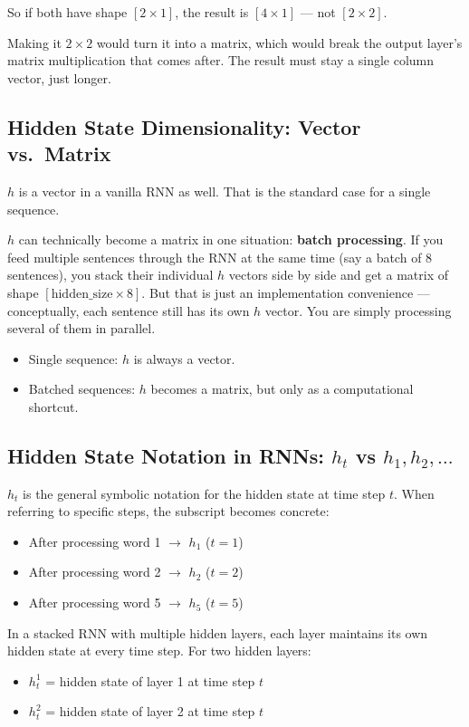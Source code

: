 So if both have shape $[2 \times 1]$, the result is $[4 \times 1]$ --- not $[2 \times 2]$.

Making it $2 \times 2$ would turn it into a matrix, which would break the output layer's matrix multiplication that comes after. The result must stay a single column vector, just longer.


\subsection{Hidden State Dimensionality: Vector vs.\ Matrix}

$h$ is a vector in a vanilla RNN as well. That is the standard case for a single sequence.

$h$ can technically become a matrix in one situation: \textbf{batch processing}. If you feed multiple sentences through the RNN at the same time (say a batch of 8 sentences), you stack their individual $h$ vectors side by side and get a matrix of shape $[\text{hidden\_size} \times 8]$. But that is just an implementation convenience --- conceptually, each sentence still has its own $h$ vector. You are simply processing several of them in parallel.

\begin{itemize}
    \item Single sequence: $h$ is always a vector.
    \item Batched sequences: $h$ becomes a matrix, but only as a computational shortcut.
\end{itemize}


\subsection{Hidden State Notation in RNNs: $h_t$ vs $h_1, h_2, \ldots$}
$h_t$ is the general symbolic notation for the hidden state at time step $t$. When referring to specific steps, the subscript becomes concrete:
\begin{itemize}
    \item After processing word 1 $\rightarrow$ $h_1$ \quad ($t = 1$)
    \item After processing word 2 $\rightarrow$ $h_2$ \quad ($t = 2$)
    \item After processing word 5 $\rightarrow$ $h_5$ \quad ($t = 5$)
\end{itemize}

In a stacked RNN with multiple hidden layers, each layer maintains its own hidden state at every time step. For two hidden layers:
\begin{itemize}
    \item $h^1_t$ = hidden state of layer 1 at time step $t$
    \item $h^2_t$ = hidden state of layer 2 at time step $t$
\end{itemize}

